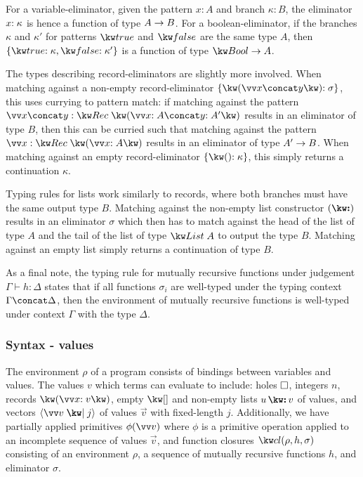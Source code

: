 For a variable-eliminator, given the pattern $x : A$ and branch $\kappa : B$, the eliminator ${x}{:}\;{\kappa}$ is hence a function of type ${A}\rightarrow{B}$. For a boolean-eliminator, if the branches $\kappa$ and $\kappa'$ for patterns $\exTrue$ and $\exFalse$ are the same type $A$, then $\elimBool{\kappa}{\kappa'}$ is a function of type $\tyFun{\tyBool}{A}$. 

The types describing record-eliminators are slightly more involved. When matching against a non-empty record-eliminator $\elimRec{\vec{x} \concat y}{\sigma}$, this uses currying to pattern match: if matching against the pattern $\vec{x} \concat y : \tyRec{\vec{\bind{x}{A}} \concat \bind{y}{A'}}$ results in an eliminator of type $B$, then this can be curried such that matching against the pattern $\vec{x} : \tyRec{\vec{\bind{x}{A}}}$ results in an eliminator of type ${A'}\rightarrow{B}$. When matching against an empty record-eliminator $\elimRecEmpty{\kappa}$, this simply returns a continuation $\kappa$. 

Typing rules for lists work similarly to records, where both branches must have the same output type $B$. Matching against the non-empty list constructor $(\symCons)$ results in an eliminator $\sigma$ which then has to match against the head of the list of type $A$ and the tail of the list of type $\tyList{A}$ to output the type $B$. Matching against an empty list simply returns a continuation of type $B$.

As a final note, the typing rule for mutually recursive functions under judgement $\Gamma \vdash h: \Delta$ states that if all functions $\sigma_i$ are well-typed under the typing context $\Gamma \concat \Delta$, then the environment of mutually recursive functions is well-typed under context $\Gamma$ with the type $\Delta$.




\subsubsection{Syntax - values}
The environment $\rho$ of a program consists of bindings between variables and values. The values $v$ which terms can evaluate to include: holes $\square$, integers $n$, records $\exRec{\vec{\bind{x}{v}}}$, empty $\exNil$ and non-empty lists $\exCons{u}{v}$ of values, and vectors $\exVecVal{\vec{v}}{j}$ of values $\vec{v}$ with fixed-length $j$. Additionally, we have partially applied primitives $\exPrimOp{\phi}{\vec{v}}$ where $\phi$ is a primitive operation applied to an incomplete sequence of values $\vec{v}$, and function closures $\exClosure{\rho}{h}{\sigma}$ consisting of an environment $\rho$, a sequence of mutually recursive functions $h$, and eliminator $\sigma$. 


